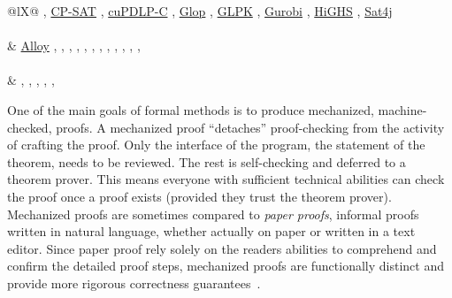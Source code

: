 \begin{table}[p!]
\begin{tabularx}{\linewidth}{@{}lX@{}}
,{ }\href{https://developers.google.com/optimization/cp/cp_solver}{CP-SAT}%
,{ }\href{https://github.com/COPT-Public/cuPDLP-C}{cuPDLP-C}%
,{ }\href{https://en.wikipedia.org/wiki/GLOP}{Glop}%
,{ }\href{https://www.gnu.org/software/glpk/}{GLPK}%
,{ }\href{https://en.wikipedia.org/wiki/Gurobi_Optimizer}{Gurobi}%
,{ }\href{https://github.com/ERGO-Code/HiGHS}{HiGHS}%
,{ }\href{https://sat4j.org}{Sat4j}%
\\\midrule
{} \\
&
\href{https://alloytools.org}{Alloy}%
,{ }\href{https://github.com/moves-rwth/attestor}{}%
,{ }\href{https://vsl.cis.udel.edu/trac/civl/wiki}{}%
,{ }\href{https://cpachecker.sosy-lab.org}{}%
,{ }\href{https://github.com/diffblue/cbmc}{}%
,{ }\href{https://github.com/uuverifiers/eldarica}{}%
,{ }\href{https://github.com/loonwerks/jkind}{}%
,{ }\href{https://github.com/nidhugg/nidhugg}{}%
,{ }\href{https://www.prismmodelchecker.org}{}%
,{ }\href{https://rebeca-lang.org/alltools/RMC}{}%
,{ }\href{https://sri-csl.github.io/sally/}{}%
,{ }\href{https://github.com/tlaplus/tlaplus}{}%
,{ }\href{https://uppaal.org}{\mbox{}}%
\\\midrule
{} \\
&
\href{https://github.com/jburnim/crest}{}%
,{ }\href{https://github.com/pschanely/CrossHair}{}%
,{ }\href{https://github.com/GillianPlatform/Gillian}{}%
,{ }\href{https://klee-se.org}{}%
,{ }\href{https://github.com/OCamlPro/owi}{}%
,{ }\href{https://github.com/SymbolicPathFinder/jpf-symbc}{}
\\
\bottomrule
\caption[Tools for formal methods]{A categorized collection of formal methods tools.}
\label{tab:fm-tools}
\end{tabularx}
\end{table}

One of the main goals of formal methods is to produce mechanized, \ie machine-checked, proofs.
A mechanized proof \enquote{detaches} proof-checking from the activity of crafting the proof.
Only the interface of the program, \ie the statement of the theorem, needs to be reviewed.
The rest is self-checking and deferred to a theorem prover.
This means everyone with sufficient technical abilities can check the proof once a proof exists (provided they trust the theorem prover).
Mechanized proofs are sometimes compared to \emph{paper proofs}, \ie informal proofs written in natural language, whether actually on paper or written in a text editor.
Since paper proof rely solely on the readers abilities to comprehend and confirm the detailed proof steps, mechanized proofs are functionally distinct and provide more rigorous correctness guarantees~\cite{gonthier2008}.

